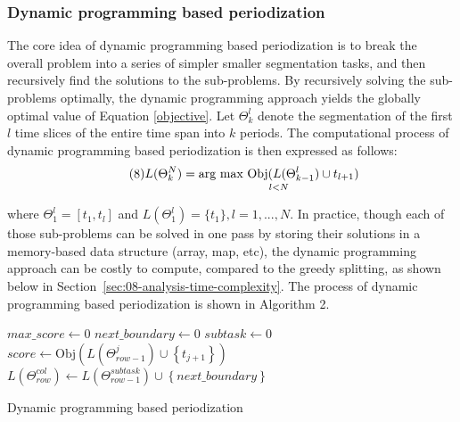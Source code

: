 \documentclass[output=paper]{langsci/langscibook}
\begin{document}
\subsubsection{Dynamic programming based periodization}

The core idea of dynamic programming based periodization is to break the overall problem into a series of simpler smaller segmentation tasks, and then recursively find the solutions to the sub-problems. By recursively solving the sub-problems optimally, the dynamic programming approach yields the globally optimal value of Equation \eqref{objective}. Let $\Theta^{l}_{k}$ denote the segmentation of the first $l$ time slices of the entire time span into $k$ periods. The computational process of dynamic programming based periodization is then expressed as follows:
\begin{equation}\tag{8}
L(\Theta^{N}_{k}) = \underset{l < N}{\textup{arg max}\ \text{Obj}(L(\Theta^{l}_{k-1})\cup t_{l + 1})}
\label{dp}
\end{equation}

where $\Theta^{l}_{1} = [t_{1}, t_{l}]$ and $L(\Theta^{l}_{1}) = \{t_{1}\}, l = 1, ..., N$. In practice, though each of those sub-problems can be solved in one pass by storing their solutions in a memory-based data structure (array, map, etc), the dynamic programming approach can be costly to compute, compared to the greedy splitting, as shown below in Section~\ref{sec:08-analysis-time-complexity}. The process of dynamic programming based periodization is shown in Algorithm 2.

\begin{algorithm}
\SetAlgoLined
{}
{
{
\;
$max\_score \leftarrow 0$\;
$next\_boundary \leftarrow 0$\;
$subtask \leftarrow 0$\;
{
$score \leftarrow \text{Obj}(L(\Theta^{j}_{row - 1}) \cup \left \{ t_{j + 1} \right \})$\;
}
$L(\Theta^{col}_{row}) \leftarrow L(\Theta^{subtask}_{row - 1}) \cup \left \{ next\_boundary \right \}$
}
}
\caption{Dynamic programming based periodization}
\end{algorithm}
\end{document}
